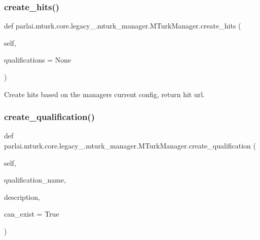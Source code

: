 \subsubsection{\texorpdfstring{create\+\_\+hits()}{create\_hits()}}
{\footnotesize\ttfamily def parlai.\+mturk.\+core.\+legacy\+\_.\+mturk\+\_\+manager.\+M\+Turk\+Manager.\+create\+\_\+hits (\begin{DoxyParamCaption}\item[{}]{self,  }\item[{}]{qualifications = {\ttfamily None} }\end{DoxyParamCaption})}

\begin{DoxyVerb}Create hits based on the managers current config, return hit url.
\end{DoxyVerb}
 \mbox{\label{classparlai_1_1mturk_1_1core_1_1legacy__2018_1_1mturk__manager_1_1MTurkManager_a0cb662e0432cc407abdee961f0d7d8e0}} 
\subsubsection{\texorpdfstring{create\+\_\+qualification()}{create\_qualification()}}
{\footnotesize\ttfamily def parlai.\+mturk.\+core.\+legacy\+\_.\+mturk\+\_\+manager.\+M\+Turk\+Manager.\+create\+\_\+qualification (\begin{DoxyParamCaption}\item[{}]{self,  }\item[{}]{qualification\+\_\+name,  }\item[{}]{description,  }\item[{}]{can\+\_\+exist = {\ttfamily True} }\end{DoxyParamCaption})}

